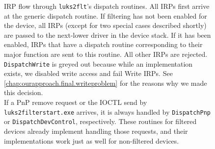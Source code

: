 \begin{figure}
	\center
	\small
	\caption[
		IRP flow through \texttt{luks2flt}'s dispatch routines
	]{
		IRP flow through \texttt{luks2flt}'s dispatch routines. All IRPs first arrive at the generic dispatch routine. If filtering has not been enabled for the device, all IRPs (except for two special cases described shortly) are passed to the next-lower driver in the device stack. If it has been enabled, IRPs that have a dispatch routine corresponding to their major function are sent to this routine. All other IRPs are rejected.\\
		\texttt{DispatchWrite} is greyed out because while an implementation exists, we disabled write access and fail Write IRPs. See \autoref{chap:ourapproach.final.writeproblem} for the reasons why we made this decision.\\
		If a PnP remove request or the IOCTL send by \texttt{luks2filterstart.exe} arrives, it is always handled by \texttt{DispatchPnp} or \texttt{DispatchDevControl}, respectively. These routines for filtered devices already implement handling those requests, and their implementations work just as well for non-filtered devices.
	}
	\label{fig:ourapproach.final.irpdispatch}
\end{figure}

